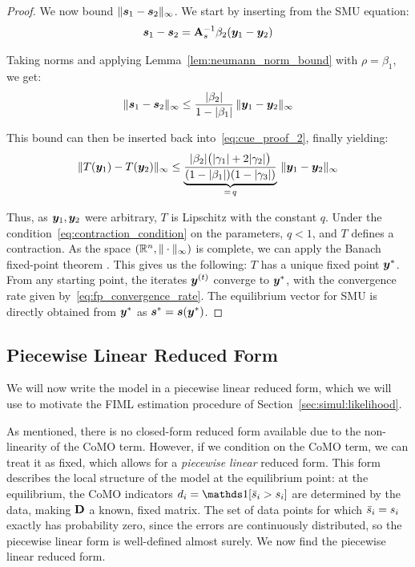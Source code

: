 \begin{proof}
We now bound $\|\bm{s}_1 - \bm{s}_2\|_\infty$. We start by inserting from the SMU equation:
\begin{equation}
\label{eq:cue_proof_3}
    \bm{s}_1 - \bm{s}_2 = \mathbf{A}_s^{-1}\beta_2(\bm{y}_1 - \bm{y}_2)
\end{equation}

Taking norms and applying Lemma~\ref{lem:neumann_norm_bound} with $\rho = \beta_1$, we get:
\begin{equation}
\label{eq:pf_step1_bound}
    \|\bm{s}_1 - \bm{s}_2\|_\infty \leq \frac{|\beta_2|}{1 - |\beta_1|}\,\|\bm{y}_1 - \bm{y}_2\|_\infty
\end{equation}

This bound can then be inserted back into~\eqref{eq:cue_proof_2}, finally yielding:
\begin{equation}
    \|T(\bm{y}_1) - T(\bm{y}_2)\|_\infty
    \leq \underbrace{\frac{|\beta_2|\bigl(|\gamma_1| + 2|\gamma_2|\bigr)}{(1 - |\beta_1|)(1 - |\gamma_3|)}}_{= \, q}\,\|\bm{y}_1 - \bm{y}_2\|_\infty
\end{equation}

Thus, as $\bm{y}_1, \bm{y}_2$ were arbitrary, $T$ is Lipschitz with the constant $q$. Under the condition~\eqref{eq:contraction_condition} on the parameters, $q < 1$, and $T$ defines a contraction. As the space $(\mathbb{R}^n, \|\cdot\|_\infty)$ is complete, we can apply the Banach fixed-point theorem \parencite[Thm.~1.1, p.~10]{GranasDugundji2003}. This gives us the following: $T$ has a unique fixed point $\bm{y}^*$. From any starting point, the iterates $\bm{y}^{(t)}$ converge to $\bm{y}^*$, with the convergence rate given by~\eqref{eq:fp_convergence_rate}. The equilibrium vector for SMU is directly obtained from $\bm{y}^*$ as $\bm{s}^* = \bm{s}(\bm{y}^*)$.
\end{proof}

\subsection{Piecewise Linear Reduced Form}
\label{sec:simul:piecewise_linear_reduced}
We will now write the model in a piecewise linear reduced form, which we will use to motivate the FIML estimation procedure of Section~\ref{sec:simul:likelihood}.

As mentioned, there is no closed-form reduced form available due to the non-linearity of the CoMO term. However, if we condition on the CoMO term, we can treat it as fixed, which allows for a \emph{piecewise linear} reduced form. This form describes the local structure of the model at the equilibrium point: at the equilibrium, the CoMO indicators $d_i = \one[\sbar_i > s_i]$ are determined by the data, making $\mathbf{D}$ a known, fixed matrix. The set of data points for which $\bar{s}_i = s_i$ exactly has probability zero, since the errors are continuously distributed, so the piecewise linear form is well-defined almost surely. We now find the piecewise linear reduced form.

